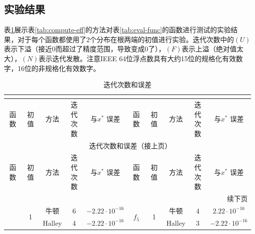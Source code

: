 \subsection{实验结果}

表\ref{tab:exp-result}展示表\ref{tab:compute-eff}的方法对表\ref{tab:eval-func}的函数进行测试的实验结果，对于每个函数都使用了2个分布在根两端的初值进行实验。迭代次数中的$(U)$表示下溢（接近0而超过了精度范围，导致变成0了），$(F)$表示上溢（绝对值太大），$(N)$表示迭代发散。注意IEEE 64位浮点数具有大约15位的规格化有效数字，16位的非规格化有效数字。


\begin{center}
    \begin{longtable}[!htbp]{c|c|ccc|c|c|ccc}
    \caption{迭代次数和误差} \vspace*{-1em} 
    \label{tab:exp-result} \\
    
    \toprule 
    函数 & 初值 & 方法 & \makecell[c]{迭代\\次数} & \makecell[c]{与$x^*$\\误差} & 函数 & 初值 & 方法 & \makecell[c]{迭代\\次数} & \makecell[c]{与$x^*$\\误差} \\ 
    \midrule 
    \endfirsthead
    
    \multicolumn{10}{c}{{\tablename\ \thetable{} 迭代次数和误差（接上页）}} \\
    \toprule 
    函数 & 初值 & 方法 & \makecell[c]{迭代\\次数} & \makecell[c]{与$x^*$\\误差} & 函数 & 初值 & 方法 & \makecell[c]{迭代\\次数} & \makecell[c]{与$x^*$\\误差} \\ 
    \midrule 
    \endhead
    
    \bottomrule 
    \multicolumn{10}{r}{{续下页}} \\
    \endfoot
    
    \bottomrule
    \endlastfoot
    
        \multirow{10}{*}{$f_1$} & 	\multirow{5}{*}{1}  & 	牛顿  & 	6  & 	$-2.22 \cdot 10^{-16}$&	 \multirow{10}{*}{$f_5$}  & 	\multirow{5}{*}{1}  & 	牛顿  & 	4  & 	$2.22 \cdot 10^{-16}$\\

        & 	   & 	Halley  & 	4  & 	$-2.22 \cdot 10^{-16}$&	   & 	   & 	Halley  & 	3  & 	$-2.22 \cdot 10^{-16}$\\
     

\end{longtable}
\end{center}
